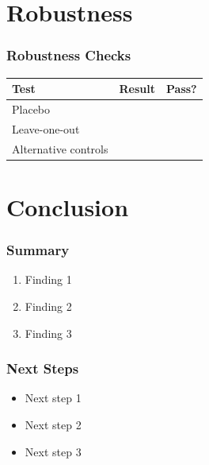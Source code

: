 \documentclass[xcolor = x11names, compress, aspectratio = 169]{beamer}
\renewcommand{\(}{\begin{columns}}
\renewcommand{\)}{\end{columns}}
\newcommand{\<}[1]{\begin{column}{#1}}
\renewcommand{\>}{\end{column}}
\begin{document}
\section{Robustness}

    \begin{frame}
    \frametitle{Robustness Checks}
        \centering
        \small
        \begin{tabular}{lcc}
            \toprule
            \textbf{Test} & \textbf{Result} & \textbf{Pass?} \\
            \midrule
            Placebo & & \\
            Leave-one-out & & \\
            Alternative controls & & \\
            \bottomrule
        \end{tabular}
    \end{frame}

\section{Conclusion}

    \begin{frame}
    \frametitle{Summary}
        \begin{enumerate}\setlength{\itemsep}{0.15cm}
            \item Finding 1
            \item Finding 2
            \item Finding 3
        \end{enumerate}
    \end{frame}

    \begin{frame}
    \frametitle{Next Steps}
        \begin{itemize}\setlength{\itemsep}{0.15cm}
            \item Next step 1
            \item Next step 2
            \item Next step 3
        \end{itemize}
    \end{frame}
\end{document}
